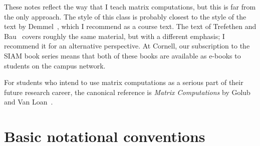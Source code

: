 \documentclass[12pt, leqno]{article} %
\begin{document}
These notes reflect the way that I teach matrix computations, but this
is far from the only approach.  The style of this class is probably
closest to the style of the text by Demmel~\cite{Demmel:1997:Applied},
which I recommend as a course text.  The text of Trefethen and
Bau~\cite{Trefethen:1997:Numerical} covers roughly the same material,
but with a different emphasis; I recommend it for an alternative
perspective.  At Cornell, our subscription to the SIAM book series
means that both of these books are available as e-books to students
on the campus network.

For students who intend to use matrix computations as a serious part of
their future research career, the canonical reference is {\em Matrix
Computations} by Golub and Van Loan~\cite{Golub:2013:Matrix}.


\section{Basic notational conventions}
\end{document}
